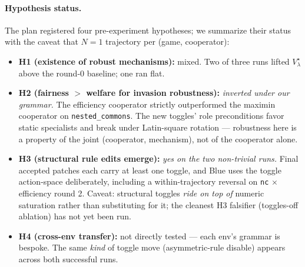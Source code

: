 \documentclass[11pt]{article}
\begin{document}
\paragraph{Hypothesis status.}
The plan registered four pre-experiment hypotheses; we summarize
their status with the caveat that $N = 1$ trajectory per
(game, cooperator):
\begin{itemize}[itemsep=2pt, topsep=2pt]
  \item \textbf{H1 (existence of robust mechanisms):}  mixed.  Two
        of three runs lifted $V_\lambda^\star$ above the round-0
        baseline; one ran flat.
  \item \textbf{H2 (fairness $>$ welfare for invasion robustness):}
        \emph{inverted under our grammar.}  The efficiency
        cooperator strictly outperformed the maximin cooperator on
        \texttt{nested\_commons}.  The new toggles' role
        preconditions favor static specialists and break under
        Latin-square rotation — robustness here is a property of
        the joint (cooperator, mechanism), not of the cooperator
        alone.
  \item \textbf{H3 (structural rule edits emerge):}  \emph{yes on
        the two non-trivial runs.}  Final accepted patches each
        carry at least one toggle, and Blue uses the toggle
        action-space deliberately, including a within-trajectory
        reversal on \texttt{nc} $\times$ efficiency round 2.
        Caveat: structural toggles \emph{ride on top of} numeric
        saturation rather than substituting for it; the cleanest
        H3 falsifier (toggles-off ablation) has not yet been run.
  \item \textbf{H4 (cross-env transfer):}  not directly tested —
        each env's grammar is bespoke.  The same \emph{kind} of
        toggle move (asymmetric-rule disable) appears across both
        successful runs.
\end{itemize}
\end{document}
